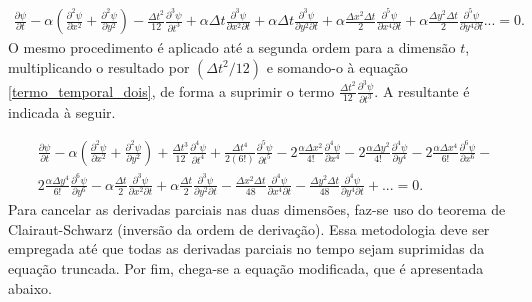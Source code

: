 \documentclass[10pt,twoside,a4paper]{article}
\begin{document}
	\begin{equation} \label{termo_temporal_dois}
	\begin{split}
	\frac{\partial \psi}{\partial t} - \alpha \left(\frac{\partial^{2} \psi}{\partial x^{2}} + \frac{\partial^{2} \psi}{\partial y^{2}} \right) - \frac{\Delta t^{2}}{12} \frac{\partial^{3}\psi}{\partial t^{3}} + \alpha \Delta t \frac{\partial^{3} \psi}{\partial x^{2} \partial t} + \alpha \Delta t \frac{\partial ^{3} \psi}{\partial y^{2} \partial t} + \alpha \frac{\Delta x^{2} \Delta t}{2} \frac{\partial^{5} \psi}{\partial x^{4} \partial t} + \alpha \frac{\Delta y^{2} \Delta t}{2} \frac{\partial^{5} \psi}{\partial y^{4} \partial t} ... = 0.
	\end{split}
	\end{equation}	
	O mesmo procedimento é aplicado até a segunda ordem para a dimensão $t$, multiplicando o resultado por $(\Delta t^{2}/12)$ e somando-o à equação \ref{termo_temporal_dois}, de forma a suprimir o termo $ \frac{\Delta t^{2}}{12} \frac{\partial^{3}\psi}{\partial t^{3}}$. A resultante é indicada à seguir.
	
	\begin{equation} \label{termo_temporal_tres}
	\begin{split}
	&\frac{\partial \psi}{\partial t} - \alpha \left(\frac{\partial^{2} \psi}{\partial x^{2}} + \frac{\partial^{2} \psi}{\partial y^{2}} \right) +\frac{\Delta t^{3}}{12} \frac{\partial^{4}\psi}{\partial t^{4}} + \frac{\Delta t^{4}}{2(6!)} \frac{\partial^{5}\psi}{\partial t^{5}}- 2 \frac{\alpha \Delta x^{2}}{4!} \frac{\partial^{4} \psi}{\partial x^{4}} - 2 \frac{\alpha \Delta y^{2}}{4!} \frac{\partial^{4} \psi}{\partial y^{4}} - 2 \frac{\alpha \Delta x^{4}}{6!} \frac{\partial^{6} \psi}{\partial x^{6}} - \\
	&2 \frac{\alpha \Delta y^{4}}{6!} \frac{\partial^{6} \psi}{\partial y^{6}} - \alpha \frac{\Delta t}{2} \frac{\partial^{3} \psi}{\partial x^{2} \partial t} + \alpha \frac{\Delta t}{2} \frac{\partial^{3} \psi}{\partial y^{2} \partial t} - \frac{\Delta x^{2} \Delta t}{48} \frac{\partial^{4} \psi}{\partial x^{4} \partial t} - \frac{\Delta y^{2} \Delta t}{48} \frac{\partial^{4} \psi}{\partial y^{4} \partial t}  +... = 0.
	\end{split}
	\end{equation}	
	Para cancelar as derivadas parciais nas duas dimensões, faz-se uso do teorema de Clairaut-Schwarz (inversão da ordem de derivação). Essa metodologia deve ser empregada até que todas as derivadas parciais no tempo sejam suprimidas da equação truncada. Por fim, chega-se a equação modificada, que é apresentada abaixo.
	
\end{document}
